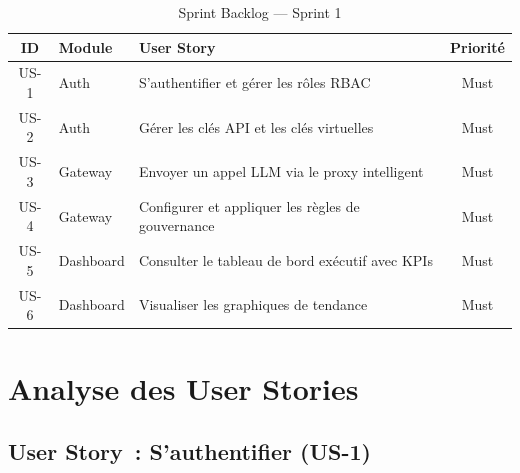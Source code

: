 \begin{table}[H]
\centering
\caption{Sprint Backlog --- Sprint 1}
\label{tab:sprint1_backlog}
\begin{tabularx}{\textwidth}{|c|l|X|c|}
\hline
\textbf{ID} & \textbf{Module} & \textbf{User Story} & \textbf{Priorité} \\
\hline
US-1 & Auth & S'authentifier et gérer les rôles RBAC & Must \\
\hline
US-2 & Auth & Gérer les clés API et les clés virtuelles & Must \\
\hline
US-3 & Gateway & Envoyer un appel LLM via le proxy intelligent & Must \\
\hline
US-4 & Gateway & Configurer et appliquer les règles de gouvernance & Must \\
\hline
US-5 & Dashboard & Consulter le tableau de bord exécutif avec KPIs & Must \\
\hline
US-6 & Dashboard & Visualiser les graphiques de tendance & Must \\
\hline
\end{tabularx}
\end{table}


\section{Analyse des User Stories}
\label{sec:s1_stories}

\subsection{User Story~: S'authentifier (US-1)}

